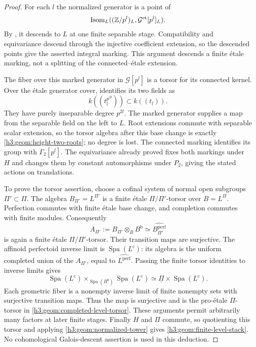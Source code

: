 \begin{proof}
For each $l$ the normalized generator is a point of
\[
 \operatorname{Isom}_L
 ((\mathbb Z/p^l)_L,\mathcal G^{\mathrm{et}}[p^l]_L).
\]
By , it descends to $L$ at
one finite separable stage.  Compatibility and equivariance
descend through the injective coefficient extension, so the
descended points give the asserted integral marking.  This
argument descends a finite \'etale marking, not a splitting of
the connected--\'etale extension.

The fiber over this marked generator in $\mathcal G[p^l]$ is a
torsor for its connected kernel.  Over the \'etale generator
cover,  identifies its two fields as
\[
 k((t_l^{p^{2l}}))\subset k((t_l)).
\]
They have purely inseparable degree $p^{2l}$.  The marked
generator supplies a map from the separable field on the left
to $L$.  Root extensions commute with separable scalar
extension, so the torsor algebra after this base change is
exactly \eqref{h3:geom:height-two-roots}; no degree is lost.
The connected marking identifies its group with
$\Gamma_2[p^l]$.  The equivariance already proved fixes both
markings under $H$ and changes them by constant automorphisms
under $P_2$, giving the stated actions on translations.

To prove the torsor assertion, choose a cofinal system of
normal open subgroups $\Pi'\subset\Pi$.  The algebra
$B_{\Pi'}=L^{\Pi'}$ is a finite \'etale $\Pi/\Pi'$-torsor over
$B=L^\Pi$.
Perfection commutes with finite \'etale base change, and
completion commutes with finite modules.  Consequently
\[
 A_{\Pi'}:=B_{\Pi'}\otimes_B B^{\mathrm b}
       \simeq\widehat{B_{\Pi'}^{\mathrm{perf}}}
\]
is again a finite \'etale $\Pi/\Pi'$-torsor.  Their transition
maps are surjective.  The affinoid perfectoid inverse limit
is $\operatorname{Spa}(L^{\mathrm c})$: its algebra is
the uniform completed union of the $A_{\Pi'}$, equal to
$\widehat{L^{\mathrm{perf}}}$.
Passing the finite torsor identities to inverse limits gives
\[
 \operatorname{Spa}(L^{\mathrm c})
 \mathbin{\times}_{\operatorname{Spa}(B^{\mathrm b})}
 \operatorname{Spa}(L^{\mathrm c})
 \simeq\underline\Pi\times\operatorname{Spa}(L^{\mathrm c}).
\]
Each geometric fiber is a nonempty inverse limit of finite
nonempty sets with surjective transition maps.  Thus the
map is surjective and is the pro-\'etale $\Pi$-torsor in
\eqref{h3:geom:completed-level-torsor}.  These arguments permit
arbitrarily many factors at later finite stages.
Finally $H$ and $\Pi$ commute,
so quotienting this torsor and applying
\eqref{h3:geom:normalized-tower} gives
\eqref{h3:geom:finite-level-stack}.  No cohomological Galois-descent
assertion is used in this deduction.
\end{proof}

